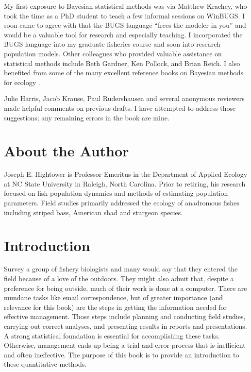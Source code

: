 \documentclass[
]{krantz}
\begin{document}
My first exposure to Bayesian statistical methods was via Matthew Krachey, who took the time as a PhD student to teach a few informal sessions on WinBUGS. I soon came to agree with \citet{kéry_2010} that the BUGS language ``frees the modeler in you'' and would be a valuable tool for research and especially teaching. I incorporated the BUGS language into my graduate fisheries course and soon into research population models. Other colleagues who provided valuable assistance on statistical methods include Beth Gardner, Ken Pollock, and Brian Reich. I also benefited from some of the many excellent reference books on Bayesian methods for ecology \citep[e.g.,][]{mccarthy_2007, kéry_2010, kéry.schaub_2012}.

Julie Harris, Jacob Krause, Paul Rudershausen and several anonymous reviewers made helpful comments on previous drafts. I have attempted to address those suggestions; any remaining errors in the book are mine.

\hypertarget{about-the-author}{%
\chapter*{About the Author}\label{about-the-author}}


Joseph E. Hightower is Professor Emeritus in the Department of Applied Ecology at NC State University in Raleigh, North Carolina. Prior to retiring, his research focused on fish population dynamics and methods of estimating population parameters. Field studies primarily addressed the ecology of anadromous fishes including striped bass, American shad and sturgeon species.

\mainmatter

\hypertarget{introduction}{%
\chapter{Introduction}\label{introduction}}

Survey a group of fishery biologists and many would say that they entered the field because of a love of the outdoors. They might also admit that, despite a preference for being outside, much of their work is done at a computer. There are mundane tasks like email correspondence, but of greater importance (and relevance for this book) are the steps in getting the information needed for effective management. Those steps include planning and conducting field studies, carrying out correct analyses, and presenting results in reports and presentations. A strong statistical foundation is essential for accomplishing these tasks. Otherwise, management ends up being a trial-and-error process that is inefficient and often ineffective. The purpose of this book is to provide an introduction to these quantitative methods.
\end{document}
